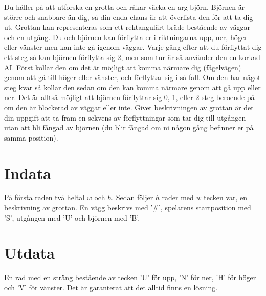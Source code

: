 Du håller på att utforska en grotta och råkar väcka en arg björn. Björnen är större och snabbare än dig, så din enda chans är att överlista den för att ta dig ut. Grottan kan representeras som ett rektangulärt bräde bestående av väggar och en utgång. Du och björnen kan förflytta er i riktningarna upp, ner, höger eller vänster men kan inte gå igenom väggar. Varje gång efter att du förflyttat dig ett steg så kan björnen förflytta sig 2, men som tur är så använder den en korkad AI. Först kollar den om det är möjligt att komma närmare dig (fågelvägen) genom att gå till höger eller vänster, och förflyttar sig i så fall. Om den har något steg kvar så kollar den sedan om den kan komma närmare genom att gå upp eller ner. Det är alltså möjligt att björnen förflyttar sig 0, 1, eller 2 steg beroende på om den är blockerad av väggar eller inte. Givet beskrivningen av grottan är det din uppgift att ta fram en sekvens av förflyttningar som tar dig till utgången utan att bli fångad av björnen (du blir fångad om ni någon gång befinner er på samma position).

\section*{Indata}
På första raden två heltal $w$ och $h$. Sedan följer $h$ rader med $w$ tecken var, en beskrivning av grottan. En vägg beskrivs med '#', spelarens startposition med 'S', utgången med 'U' och björnen med 'B'.

\section*{Utdata}
En rad med en sträng bestående av tecken 'U' för upp, 'N' för ner, 'H' för höger och 'V' för vänster. Det är garanterat att det alltid finns en lösning.
